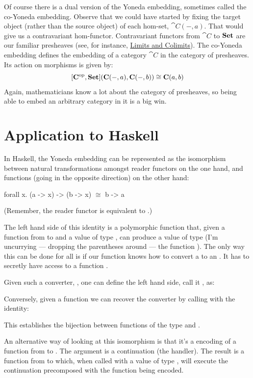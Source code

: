 Of course there is a dual version of the Yoneda embedding, sometimes
called the co-Yoneda embedding. Observe that we could have started by
fixing the target object (rather than the source object) of each
hom-set, $\cat{C}(-, a)$. That would give us a contravariant
hom-functor. Contravariant functors from $\cat{C}$ to $\mathbf{Set}$ are
our familiar presheaves (see, for instance,
\hyperref[limits-and-colimits]{Limits
  and Colimits}). The co-Yoneda embedding defines the embedding of a
category $\cat{C}$ in the category of presheaves. Its action on morphisms
is given by:
\[[\mathbf{C}^{\mathrm{op}}, \mathbf{Set}](\mathbf{C}(-, a), \mathbf{C}(-, b)) \cong \mathbf{C}(a, b)\]
Again, mathematicians know a lot about the category of presheaves, so
being able to embed an arbitrary category in it is a big win.

\section{Application to Haskell}

In Haskell, the Yoneda embedding can be represented as the isomorphism
between natural transformations amongst reader functors on the one hand,
and functions (going in the opposite direction) on the other hand:

\begin{snipv}
forall x. (a -> x) -> (b -> x) \ensuremath{\cong} b -> a
\end{snipv}
(Remember, the reader functor is equivalent to
.)

The left hand side of this identity is a polymorphic function that,
given a function from  to  and a value of type
, can produce a value of type  (I'm uncurrying ---
dropping the parentheses around --- the function
). The only way this can be done for all
 is if our function knows how to convert a  to an
. It has to secretly have access to a function
.

Given such a converter, , one can define the left hand
side, call it , as:

Conversely, given a function  we can recover the converter
by calling  with the identity:

This establishes the bijection between functions of the type
 and .

An alternative way of looking at this isomorphism is that it's a 
encoding of a function from  to . The argument
 is a continuation (the handler). The result
is a function from  to  which, when called with a
value of type , will execute the continuation precomposed with
the function being encoded.


